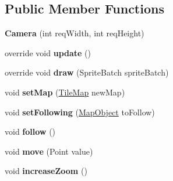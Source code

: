 \subsection*{Public Member Functions}
\begin{DoxyCompactItemize}
\item 
\hypertarget{class_simple_r_p_g_1_1_camera_a3df3d47b11911673673c2b6f4ca93f2b}{{\bfseries Camera} (int req\-Width, int req\-Height)}\label{class_simple_r_p_g_1_1_camera_a3df3d47b11911673673c2b6f4ca93f2b}

\item 
\hypertarget{class_simple_r_p_g_1_1_camera_a5582cdc36b4cfff4a674d1f743b0d820}{override void {\bfseries update} ()}\label{class_simple_r_p_g_1_1_camera_a5582cdc36b4cfff4a674d1f743b0d820}

\item 
\hypertarget{class_simple_r_p_g_1_1_camera_ac68268d0cd0f0e3a03bad80e689aa352}{override void {\bfseries draw} (Sprite\-Batch sprite\-Batch)}\label{class_simple_r_p_g_1_1_camera_ac68268d0cd0f0e3a03bad80e689aa352}

\item 
\hypertarget{class_simple_r_p_g_1_1_camera_aa79c2b9a8151f5441c694f5e6ccd2cfd}{void {\bfseries set\-Map} (\hyperlink{class_simple_r_p_g_1_1_tile_map}{Tile\-Map} new\-Map)}\label{class_simple_r_p_g_1_1_camera_aa79c2b9a8151f5441c694f5e6ccd2cfd}

\item 
\hypertarget{class_simple_r_p_g_1_1_camera_ac252db1ef72425c155d7914a408320bd}{void {\bfseries set\-Following} (\hyperlink{class_simple_r_p_g_1_1_map_object}{Map\-Object} to\-Follow)}\label{class_simple_r_p_g_1_1_camera_ac252db1ef72425c155d7914a408320bd}

\item 
\hypertarget{class_simple_r_p_g_1_1_camera_a0fd8e940f8f45fa9b2d6a8dc625211ea}{void {\bfseries follow} ()}\label{class_simple_r_p_g_1_1_camera_a0fd8e940f8f45fa9b2d6a8dc625211ea}

\item 
\hypertarget{class_simple_r_p_g_1_1_camera_a9765209fd53634d10039c02ac3efc58e}{void {\bfseries move} (Point value)}\label{class_simple_r_p_g_1_1_camera_a9765209fd53634d10039c02ac3efc58e}

\item 
\hypertarget{class_simple_r_p_g_1_1_camera_a49af7ca99f42cb5fe226fdc40c9cf4bd}{void {\bfseries increase\-Zoom} ()}\label{class_simple_r_p_g_1_1_camera_a49af7ca99f42cb5fe226fdc40c9cf4bd}


\end{DoxyCompactItemize}
